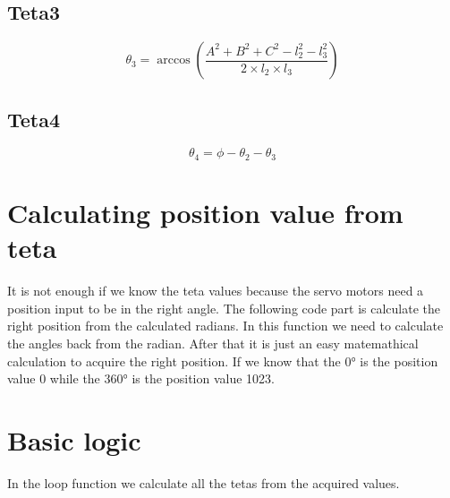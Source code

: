 			
	
		\subsection{Teta3}
		
			\hspace{15pt}\[ \theta_3 = \arccos(\frac{A^2+B^2+C^2-l_2^2-l_3^2}{2\times l_2\times l_3}) \]
		
			
	
		\subsection{Teta4}
		
			\hspace{15pt}\[ \theta_4 = \phi - \theta_2 - \theta_3 \]
		
			
	
	
	\section{Calculating position value from teta}
	
		\hspace{15pt}It is not enough if we know the teta values because the servo motors need a position input to be in the right angle. The following code part is calculate the right position from the calculated radians. In this function we need to calculate the angles back from the radian. After that it is just an easy matemathical calculation to acquire the right position. If we know that the 0° is the position value 0 while the 360° is the position value 1023.
	
		
		
		
	\section{Basic logic}
	
		\hspace{15pt}In the loop function we calculate all the tetas from the acquired values.
		
